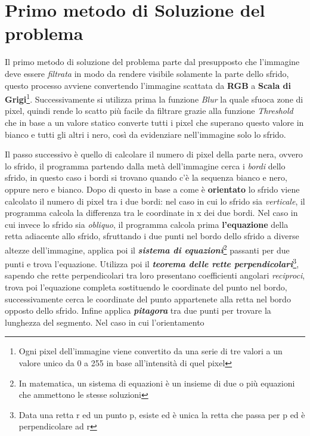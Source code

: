 \documentclass[a4paper, notitlepage, 12pt]{article}
\begin{document}
    \section{Primo metodo di Soluzione del problema}
    \noindent Il primo metodo di soluzione del problema parte dal presupposto che l'immagine deve essere \emph{filtrata} in modo
    da rendere visibile solamente la parte dello sfrido, questo processo avviene convertendo l'immagine scattata da \textbf{RGB} a 
    \textbf{Scala di Grigi}\footnote[4]{\indent Ogni pixel dell'immagine viene convertito da una serie di tre valori a un valore unico da 0 a 255 in base all'intensità di quel pixel}.
    Successivamente si utilizza prima la funzione \emph{Blur} la quale sfuoca zone di pixel, quindi rende lo scatto più facile da filtrare 
    grazie alla funzione \emph{Threshold} che in base a un valore statico converte tutti i pixel che superano questo valore in bianco e tutti gli altri i nero,
    così da evidenziare nell'immagine solo lo sfrido.\par
    \noindent Il passo successivo è quello di calcolare il numero di pixel della parte nera, ovvero lo sfrido, il programma partendo 
    dalla metà dell'immagine cerca i \emph{bordi} dello sfrido, in questo caso i bordi si trovano quando c'è la sequenza bianco e nero, oppure
    nero e bianco. Dopo di questo in base a come è \textbf{orientato} lo sfrido viene calcolato il numero di pixel tra i due bordi: nel caso
    in cui lo sfrido sia \emph{verticale}, il programma calcola la differenza tra le coordinate in x dei due bordi.
    \noindent Nel caso in cui invece lo sfrido sia \emph{obliquo}, il programma calcola prima \textbf{l'equazione} della retta adiacente allo sfrido, sfruttando i due punti nel bordo dello sfrido
    a diverse altezze dell'immagine, applica poi il \emph{\textbf{sistema di equazioni}}\footnote[5]{\indent In matematica, un sistema di equazioni è un insieme di due o più equazioni che ammettono le stesse soluzioni} passanti per due punti e trova l'equazione. Utilizza poi 
    il \emph{\textbf{teorema delle rette perpendicolari}}\footnote[6]{\indent Data una retta r ed un punto p, esiste ed è unica la retta che passa per p ed è perpendicolare ad r}, sapendo che rette perpendicolari tra loro presentano coefficienti angolari \emph{reciproci},
    trova poi l'equazione completa sostituendo le coordinate del punto nel bordo, successivamente cerca le coordinate del punto appartenete alla 
    retta nel bordo opposto dello sfrido. Infine applica \emph{\textbf{pitagora}} tra due punti per trovare la lunghezza del segmento. Nel caso in cui l'orientamento
\end{document}
